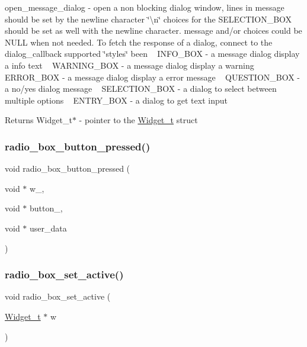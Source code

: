 open\+\_\+message\+\_\+dialog -\/ open a non blocking dialog window, lines in message should be set by the newline character \char`\"{}\textbackslash{}n\char`\"{} choices for the S\+E\+L\+E\+C\+T\+I\+O\+N\+\_\+\+B\+OX should be set as well with the newline character. message and/or choices could be N\+U\+LL when not needed. To fetch the response of a dialog, connect to the dialog\+\_\+callback supported \char`\"{}styles\char`\"{} been ~\newline
I\+N\+F\+O\+\_\+\+B\+OX -\/ a message dialog display a info text ~\newline
W\+A\+R\+N\+I\+N\+G\+\_\+\+B\+OX -\/ a message dialog display a warning ~\newline
E\+R\+R\+O\+R\+\_\+\+B\+OX -\/ a message dialog display a error message ~\newline
Q\+U\+E\+S\+T\+I\+O\+N\+\_\+\+B\+OX -\/ a no/yes dialog message ~\newline
S\+E\+L\+E\+C\+T\+I\+O\+N\+\_\+\+B\+OX -\/ a dialog to select between multiple options ~\newline
E\+N\+T\+R\+Y\+\_\+\+B\+OX -\/ a dialog to get text input 

\begin{DoxyReturn}{Returns}
Widget\+\_\+t$\ast$ -\/ pointer to the \hyperlink{structWidget__t}{Widget\+\_\+t} struct 
\end{DoxyReturn}
\mbox{\label{xmessage-dialog_8c_a8df87e5f315fc3bea96542839aa6c083}} 
\subsubsection{\texorpdfstring{radio\+\_\+box\+\_\+button\+\_\+pressed()}{radio\_box\_button\_pressed()}}
{\footnotesize\ttfamily void radio\+\_\+box\+\_\+button\+\_\+pressed (\begin{DoxyParamCaption}\item[{void $\ast$}]{w\+\_\+,  }\item[{void $\ast$}]{button\+\_\+,  }\item[{void $\ast$}]{user\+\_\+data }\end{DoxyParamCaption})}

\mbox{\label{xmessage-dialog_8c_ae2414db18fe2e55ea84644a15d1cd8ef}} 
\subsubsection{\texorpdfstring{radio\+\_\+box\+\_\+set\+\_\+active()}{radio\_box\_set\_active()}}
{\footnotesize\ttfamily void radio\+\_\+box\+\_\+set\+\_\+active (\begin{DoxyParamCaption}\item[{\hyperlink{structWidget__t}{Widget\+\_\+t} $\ast$}]{w }\end{DoxyParamCaption})}

